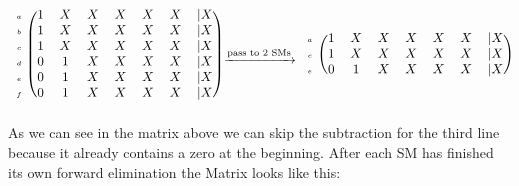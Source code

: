 \documentclass[draft, final]{vutinfth} %
\begin{document}
				\begin{equation}
					\begin{aligned}
						\begin{blockarray}{cccccccc}
							\begin{block}{c(ccccccc)}
								\scriptscriptstyle{a} & 1 & X & X & X & X & X &| X \\ 
								\scriptscriptstyle{b} & 1 & X & X & X & X & X &| X \\ 
								\scriptscriptstyle{c} & 1 & X & X & X & X & X &| X \\ 
								\scriptscriptstyle{d} & 0 & 1 & X & X & X & X &| X \\ 
								\scriptscriptstyle{e} & 0 & 1 & X & X & X & X &| X \\ 
								\scriptscriptstyle{f} & 0 & 1 & X & X & X & X &| X \\
							\end{block}
						\end{blockarray}
						\xrightarrow[]{\text{pass to 2 SMs}}
						\begin{blockarray}{cccccccc}
							\begin{block}{c(ccccccc)}
								\scriptscriptstyle{a} & 1 & X & X & X & X & X &| X \\ 
								\scriptscriptstyle{c} & 1 & X & X & X & X & X &| X \\ 
								\scriptscriptstyle{e} & 0 & 1 & X & X & X & X &| X \\ 
							\end{block}
						\end{blockarray}
					\end{aligned}
				\end{equation}
				As we can see in the matrix above we can skip the subtraction for the third line because it already contains a zero at the beginning. After each SM has finished its own forward elimination the Matrix looks like this:
\end{document}
